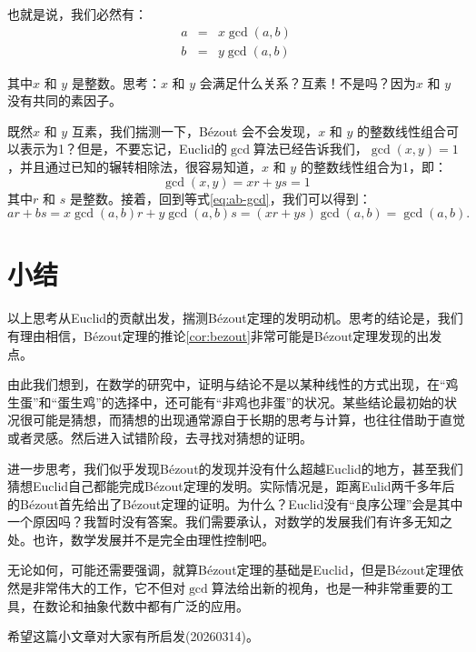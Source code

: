\documentclass[12pt,a4paper]{ctexart}
\theoremstyle{plain}
\theoremstyle{definition}
\theoremstyle{remark}
\begin{document}
也就是说，我们必然有：
\begin{eqnarray}
\label{eq:ab-gcd}
  a &=& x \gcd(a,b)\\
  b &=& y \gcd(a,b)
\end{eqnarray}

其中$x$ 和 $y$ 是整数。思考：$x$ 和 $y$ 会满足什么关系？互素！不是吗？因为$x$ 和 $y$ 没有共同的素因子。

既然$x$ 和 $y$ 互素，我们揣测一下，B\'ezout 会不会发现，$x$ 和 $y$ 的整数线性组合可以表示为1？但是，不要忘记，Euclid的$\gcd$算法已经告诉我们，$\gcd(x,y) = 1$，并且通过已知的辗转相除法，很容易知道，$x$ 和 $y$ 的整数线性组合为1，即：
\[\gcd(x, y) =  xr  + ys = 1\]其中$r$ 和 $s$ 是整数。接着，回到等式\ref{eq:ab-gcd}，我们可以得到：
\[ ar + bs = x \gcd(a,b) r + y \gcd(a,b) s = (xr + ys) \gcd(a,b) = \gcd(a,b).\]

\section{小结}
以上思考从Euclid的贡献出发，揣测B\'ezout定理的发明动机。思考的结论是，我们有理由相信，B\'ezout定理的推论\ref{cor:bezout}非常可能是B\'ezout定理发现的出发点。

由此我们想到，在数学的研究中，证明与结论不是以某种线性的方式出现，在“鸡生蛋”和“蛋生鸡”的选择中，还可能有“非鸡也非蛋”的状况。某些结论最初始的状况很可能是猜想，而猜想的出现通常源自于长期的思考与计算，也往往借助于直觉或者灵感。然后进入试错阶段，去寻找对猜想的证明。

进一步思考，我们似乎发现B\'ezout的发现并没有什么超越Euclid的地方，甚至我们猜想Euclid自己都能完成B\'ezout定理的发明。实际情况是，距离Eulid两千多年后的B\'ezout首先给出了B\'ezout定理的证明。为什么？Euclid没有“良序公理”会是其中一个原因吗？我暂时没有答案。我们需要承认，对数学的发展我们有许多无知之处。也许，数学发展并不是完全由理性控制吧。

无论如何，可能还需要强调，就算B\'ezout定理的基础是Euclid，但是B\'ezout定理依然是非常伟大的工作，它不但对$\gcd$算法给出新的视角，也是一种非常重要的工具，在数论和抽象代数中都有广泛的应用。

希望这篇小文章对大家有所启发(20260314)。
\end{document}
